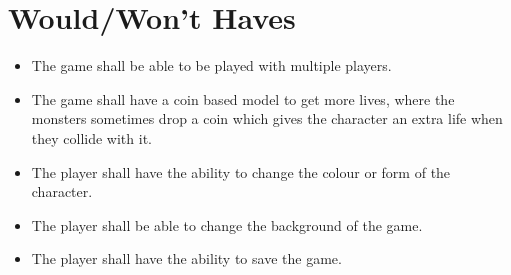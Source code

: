 \section{Would/Won't Haves}
\begin{itemize}
\itemsep0em 
	\item The game shall be able to be played with multiple players.
	\item The game shall have a coin based model to get more lives, where the monsters sometimes drop a coin which gives the character an extra life when they collide with it.
	\item The player shall have the ability to change the colour or form of the character.
	\item The player shall be able to change the background of the game.
	\item The player shall have the ability to save the game.
\end{itemize}
